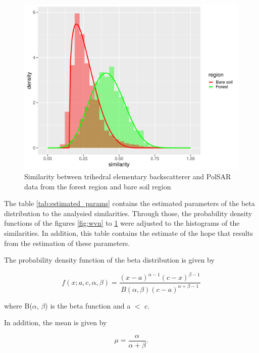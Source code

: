 \documentclass[conference]{IEEEtran}
\begin{document}
\begin{figure}[!ht]
    \centering
    \includegraphics[width = .9\linewidth, height = .7\linewidth]{../../../Figures/paper_19_05/tr.pdf}
    \caption{Similarity between trihedral elementary backscatterer and PolSAR data from the forest region and bare soil region}
    \label{fig:tr}
\end{figure}

The table \ref{tab:estimated_params} contains the estimated parameters of the beta distribution to the analysied similarities. Through those, the probability density functions of the figures \ref{fig:wvn} to \ref{fig:tr} were adjusted to the histograms of the similarities. In addition, this table contains the estimate of the hope that results from the estimation of these parameters.

The probability density function of the beta distribution is given by

\begin{equation}
  f(x; a, c, \alpha, \beta) = \frac{(x - a)^{\alpha-1} (c - x)^{\beta - 1}}{B(\alpha, \beta) (c - a)^{\alpha + \beta - 1}}
\end{equation}

where B($\alpha$, $\beta$) is the beta function and a $<$ c.

In addition, the mean is given by

\begin{equation}
  \mu = \frac{\alpha}{\alpha + \beta}.
\end{equation}
\end{document}
